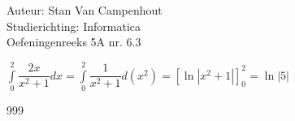 \documentclass[a4paper]{article}
\begin{document}
  
\noindent \large Auteur: Stan Van Campenhout \\
\noindent \large Studierichting:  Informatica\\
\noindent \large Oefeningenreeks 5A nr. 6.3\\

\medskip

\normalsize

$ \displaystyle\int\limits_0^2\dfrac{2x}{x^2+1}dx = \displaystyle\int\limits_0^2\dfrac{1}{x^2+1}d\left(x^2\right) = \left[\ln\left|x^2+1\right|\right]_0^2 = \ln|5| $\\

\begin{thebibliography}{999}
\end{thebibliography}
\end{document}
